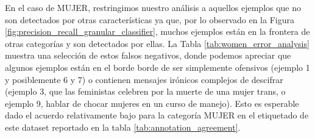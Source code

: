 En el caso de MUJER, restringimos nuestro análisis a aquellos ejemplos que no son detectados por otras características ya que, por lo observado en la Figura \ref{fig:precision_recall_granular_classifier}, muchos ejemplos están en la frontera de otras categorías y son detectados por ellas. La Tabla \ref{tab:women_error_analysis} muestra una selección de estos falsos negativos, donde podemos apreciar que algunos ejemplos están en el borde borde de ser simplemente ofensivos (ejemplo 1 y posiblemente 6 y 7) o contienen mensajes irónicos complejos de descifrar (ejemplo 3, que las feministas celebren por la muerte de una mujer trans, o ejemplo 9, hablar de chocar mujeres en un curso de manejo). Esto es esperable dado el acuerdo relativamente bajo para la categoría MUJER en el etiquetado de este dataset reportado en la tabla \ref{tab:annotation_agreement}.




